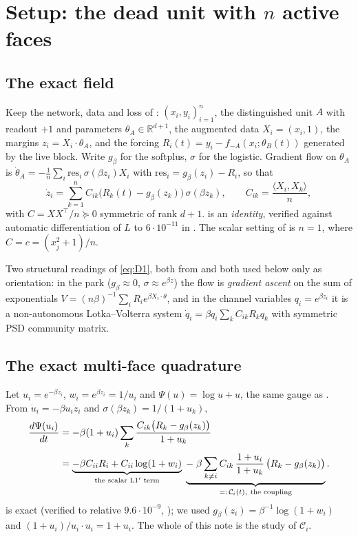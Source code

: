 \documentclass[11pt]{article}
\theoremstyle{remark}
\newcommand{\R}{\mathbb{R}}
\newcommand{\res}{\mathrm{res}}
\begin{document}
\tableofcontents

\section{Setup: the dead unit with $n$ active faces}\label{sec:setup}

\subsection{The exact field}

Keep the network, data and loss of \cite[\S2]{paper}: $(x_i,y_i)_{i=1}^n$, the
distinguished unit $A$ with readout $+1$ and parameters
$\theta_A\in\R^{d+1}$, the augmented data $X_i=(x_i,1)$, the margins
$z_i=X_i\cdot\theta_A$, and the forcing
$R_i(t)=y_i-f_{-A}(x_i;\theta_B(t))$ generated by the live block. Write
$g_\beta$ for the softplus, $\sigma$ for the logistic. Gradient flow on
$\theta_A$ is $\dot\theta_A=-\frac1n\sum_i\res_i\,\sigma(\beta z_i)X_i$ with
$\res_i=g_\beta(z_i)-R_i$, so that
\begin{equation}\label{eq:D1}
\boxed{\
\dot z_i=\sum_{k=1}^{n}C_{ik}\bigl(R_k(t)-g_\beta(z_k)\bigr)\,\sigma(\beta z_k),
\qquad C_{ik}=\frac{\langle X_i,X_k\rangle}{n},\ }
\end{equation}
with $C=XX^\top/n\succeq0$ symmetric of rank $d+1$.  is an
\emph{identity}, verified against automatic differentiation of $L$ to $6\cdot
10^{-11}$ in \cite[I1]{scoping}. The scalar setting of \cite[Thm.~6]{paper} is
$n=1$, where $C=c=(x_j^2+1)/n$.

Two structural readings of \eqref{eq:D1}, both from \cite{scoping} and both used
below only as orientation: in the park ($g_\beta\approx0$, $\sigma\approx
e^{\beta z}$) the flow is \emph{gradient ascent} on the sum of exponentials
$V=(n\beta)^{-1}\sum_iR_ie^{\beta X_i\cdot\theta}$, and in the channel variables
$q_i=e^{\beta z_i}$ it is a non-autonomous Lotka--Volterra system
$\dot q_i=\beta q_i\sum_kC_{ik}R_kq_k$ with symmetric PSD community matrix.

\subsection{The exact multi-face quadrature}

Let $u_i=e^{-\beta z_i}$, $w_i=e^{\beta z_i}=1/u_i$ and $\Psi(u)=\log u+u$, the
same gauge as \cite[L1$'$]{paper}. From $\dot u_i=-\beta u_i\dot z_i$ and
$\sigma(\beta z_k)=1/(1+u_k)$,
\begin{align}
\frac{d\Psi(u_i)}{dt}
&=-\beta(1+u_i)\sum_{k}\frac{C_{ik}\bigl(R_k-g_\beta(z_k)\bigr)}{1+u_k}
\notag\\[2pt]
&=\underbrace{-\beta C_{ii}R_i+C_{ii}\log(1+w_i)}_{\text{the scalar L1}'\text{ term}}
\;\underbrace{-\;\beta\sum_{k\ne i}C_{ik}\,\frac{1+u_i}{1+u_k}\,
\bigl(R_k-g_\beta(z_k)\bigr)}_{=:\,\mathcal C_i(t),\ \text{the coupling}} .
\label{eq:D4}
\end{align}
 is exact (verified to relative $9.6\cdot10^{-9}$,
\cite[I2]{scoping}); we used $g_\beta(z_i)=\beta^{-1}\log(1+w_i)$ and
$(1+u_i)/u_i\cdot u_i=1+u_i$. The whole of this note is the study of
$\mathcal C_i$.
\end{document}
